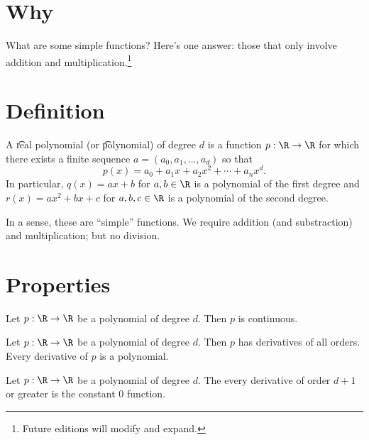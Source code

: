 
\section*{Why}

What are some simple functions?
Here's one answer: those that only involve addition and multiplication.\footnote{Future editions will modify and expand.}

\section*{Definition}

A \t{real polynomial} (or \t{polynomial}) of degree $d$ is a function $p: \R  \to \R $ for which there exists a finite sequence $a = (a_0, a_1, \dots , a_d)$ so that
\[
p(x) = a_0 + a_1 x + a_2 x^2 + \cdots + a_nx^d.
\]
In particular, $q(x) = ax + b$ for $a, b \in \R $ is a polynomial of the first degree and $r(x) = ax^2 + bx + c$ for $a, b, c \in \R $ is a polynomial of the second degree.

In a sense, these are ``simple'' functions.
We require addition (and substraction) and multiplication; but no division.

\section*{Properties}

\begin{proposition}
Let $p: \R  \to \R $ be a polynomial of degree $d$.
Then $p$ is continuous.
\end{proposition}

\begin{proposition}
Let $p: \R  \to \R $ be a polynomial of degree $d$.
Then $p$ has derivatives of all orders.
Every derivative of $p$ is a polynomial.
\end{proposition}

\begin{proposition}
Let $p: \R  \to \R $ be a polynomial of degree $d$.
The every derivative of order $d+1$ or greater is the constant 0 function.
\end{proposition}

\blankpage